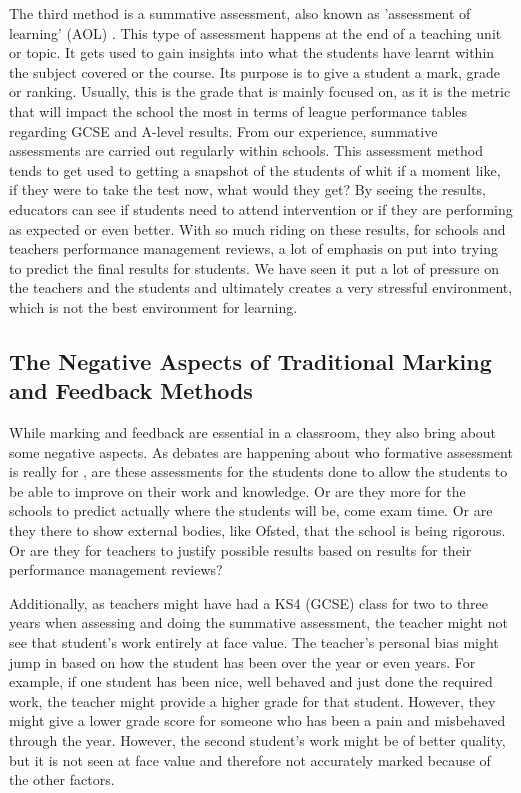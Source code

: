 		The third method is a summative assessment, also known as 'assessment of learning' (AOL) \cite{wellington2007secondary}. This type of assessment happens at the end of a teaching unit or topic. It gets used to gain insights into what the students have learnt within the subject covered or the course. Its purpose is to give a student a mark, grade or ranking. Usually, this is the grade that is mainly focused on, as it is the metric that will impact the school the most in terms of league performance tables regarding GCSE and A-level results. From our experience, summative assessments are carried out regularly within schools. This assessment method tends to get used to getting a snapshot of the students of whit if a moment like, if they were to take the test now, what would they get? By seeing the results, educators can see if students need to attend intervention or if they are performing as expected or even better. With so much riding on these results, for schools and teachers performance management reviews, a lot of emphasis on put into trying to predict the final results for students. We have seen it put a lot of pressure on the teachers and the students and ultimately creates a very stressful environment, which is not the best environment for learning.
	
	
	\subsection{The Negative Aspects of Traditional Marking and Feedback Methods}
		
		While marking and feedback are essential in a classroom, they also bring about some negative aspects. As debates are happening about who formative assessment is really for \cite{wellington2007secondary}, are these assessments for the students done to allow the students to be able to improve on their work and knowledge. Or are they more for the schools to predict actually where the students will be, come exam time. Or are they there to show external bodies, like Ofsted, that the school is being rigorous. Or are they for teachers to justify possible results based on results for their performance management reviews?
		
		Additionally, as teachers might have had a KS4 (GCSE) class for two to three years when assessing and doing the summative assessment, the teacher might not see that student's work entirely at face value. The teacher's personal bias might jump in based on how the student has been over the year or even years. For example, if one student has been nice, well behaved and just done the required work, the teacher might provide a higher grade for that student. However, they might give a lower grade score for someone who has been a pain and misbehaved through the year. However, the second student's work might be of better quality, but it is not seen at face value and therefore not accurately marked because of the other factors.
		
